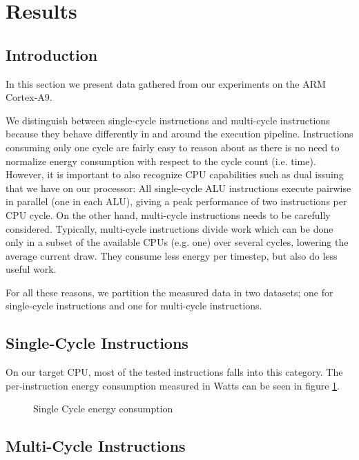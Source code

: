 \section{Results}

\subsection{Introduction}
In this section we present data gathered from our experiments on the ARM
Cortex-A9.

We distinguish between single-cycle instructions and multi-cycle instructions
because they behave differently in and around the execution pipeline.
Instructions consuming only one cycle are fairly easy to reason about as there
is no need to normalize energy consumption with respect to the cycle count (i.e.
time). However, it is important to also recognize CPU capabilities such as dual
issuing that we have on our processor: All single-cycle ALU instructions execute
pairwise in parallel (one in each ALU), giving a peak performance of two
instructions per CPU cycle. On the other hand, multi-cycle instructions needs to
be carefully considered. Typically, multi-cycle instructions divide work which
can be done only in a subset of the available CPUs (e.g. one) over several
cycles, lowering the average current draw. They consume less energy per
timestep, but also do less useful work.

For all these reasons, we partition the measured data in two datasets; one for
single-cycle instructions and one for multi-cycle instructions.

\subsection{Single-Cycle Instructions}
On our target CPU, most of  the tested instructions falls into
this category. The per-instruction energy consumption measured in Watts can be
seen in figure \ref{fig:singlecycle}.

\begin{figure}
    \caption{Single Cycle energy consumption}
    \label{fig:singlecycle}
\end{figure}

\subsection{Multi-Cycle Instructions}

